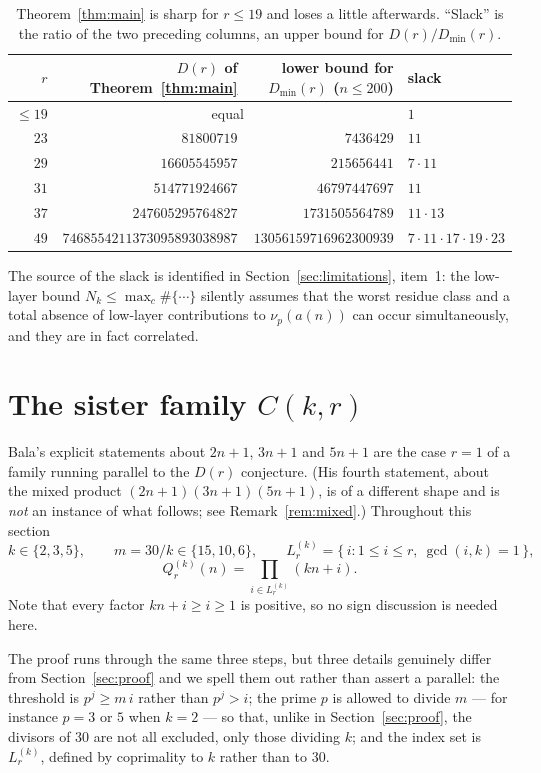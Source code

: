 \documentclass[11pt]{article}
\theoremstyle{plain}
\theoremstyle{definition}
\theoremstyle{remark}
\numberwithin{equation}{section}
\begin{document}
\begin{table}[ht]
\centering
\small
\begin{tabular}{@{}rrrl@{}}
\toprule
$r$ & $D(r)$ of Theorem~\ref{thm:main} & lower bound for $D_{\min}(r)$ ($n \le 200$) & slack \\
\midrule
$\le 19$ & \multicolumn{2}{c}{equal} & $1$ \\
$23$ & $81800719$ & $7436429$ & $11$ \\
$29$ & $16605545957$ & $215656441$ & $7\cdot 11$ \\
$31$ & $514771924667$ & $46797447697$ & $11$ \\
$37$ & $247605295764827$ & $1731505564789$ & $11\cdot 13$ \\
$49$ & $7468554211373095893038987$ & $13056159716962300939$ & $7\cdot11\cdot17\cdot19\cdot23$ \\
\bottomrule
\end{tabular}
\caption{Theorem~\ref{thm:main} is sharp for $r \le 19$ and loses a little afterwards. ``Slack''
is the ratio of the two preceding columns, an upper bound for $D(r)/D_{\min}(r)$.}
\label{tab:minimal}
\end{table}

The source of the slack is identified in Section~\ref{sec:limitations}, item~1: the low-layer
bound $N_k \le \max_c \#\{\cdots\}$ silently assumes that the worst residue class and a total
absence of low-layer contributions to $\nu_p(a(n))$ can occur simultaneously, and they are in
fact correlated.

\section{The sister family $C(k,r)$}
\label{sec:Ckr}

Bala's explicit statements about $2n+1$, $3n+1$ and $5n+1$ are the case $r=1$ of a family running
parallel to the $D(r)$ conjecture. (His fourth statement, about the mixed product
$(2n+1)(3n+1)(5n+1)$, is of a different shape and is \emph{not} an instance of what follows; see
Remark~\ref{rem:mixed}.) Throughout this section
\[
  k \in \{2,3,5\}, \qquad m = 30/k \in \{15,10,6\}, \qquad
  L^{(k)}_r = \{\, i : 1 \le i \le r,\ \gcd(i,k)=1 \,\},
\]
\[
  Q^{(k)}_r(n) = \prod_{i \in L^{(k)}_r}(kn+i).
\]
Note that every factor $kn+i \ge i \ge 1$ is positive, so no sign discussion is needed here.

The proof runs through the same three steps, but three details genuinely differ from
Section~\ref{sec:proof} and we spell them out rather than assert a parallel: the threshold is
$p^j \ge m\,i$ rather than $p^j > i$; the prime $p$ is allowed to divide $m$ --- for instance
$p = 3$ or $5$ when $k = 2$ --- so that, unlike in Section~\ref{sec:proof}, the divisors of $30$
are not all excluded, only those dividing $k$; and the index set is $L^{(k)}_r$, defined by
coprimality to $k$ rather than to $30$.
\end{document}
